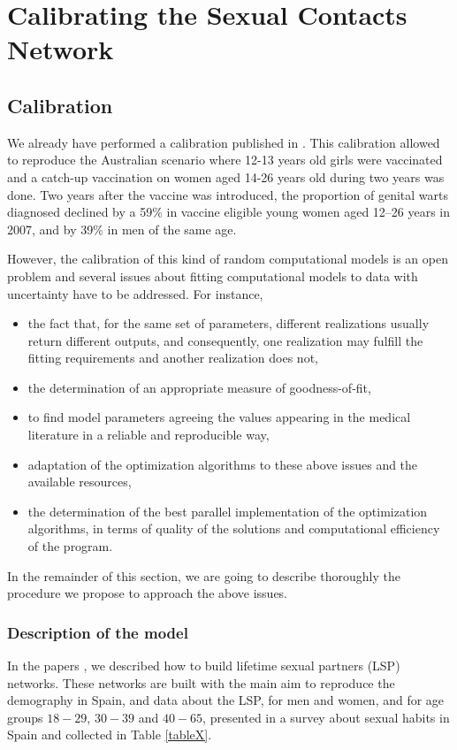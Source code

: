 \chapter{Calibrating the Sexual Contacts Network }\label{Calibrado}

\section{Calibration}
We already have performed a calibration published in \cite{Acedo2017}. This calibration allowed to reproduce the Australian scenario \cite{DezDomingo2017} where 12-13 years old girls were vaccinated and a catch-up vaccination on women aged 14-26 years old during two years was done. Two years after the vaccine was introduced, the proportion of genital warts diagnosed declined by a 59\% in vaccine eligible young women aged 12–26 years in 2007, and by 39\% in men of the same age.

However, the calibration of this kind of random computational models is an open problem and several issues about fitting computational models to data with uncertainty have to be addressed. For instance, 

\begin{itemize}
	\item the fact that, for the same set of parameters, different realizations usually return different outputs, and consequently, one realization may fulfill the fitting requirements and another realization does not,
	\item the determination of an appropriate measure of goodness-of-fit,
	\item to find model parameters agreeing the values appearing in the medical literature in a reliable and reproducible way,
	\item adaptation of the optimization algorithms to these above issues and the available resources,
	\item the determination of the best parallel implementation of the optimization algorithms, in terms of quality of the solutions and computational efficiency of the program.
\end{itemize} 

In the remainder of this section, we are going to describe thoroughly the procedure we propose to approach the above issues.

\subsection{Description of the model}\label{sec:modelo}
In the papers \cite{Acedo2017,DezDomingo2017}, we described how to build lifetime sexual partners (LSP) networks. These networks are built with the main aim to reproduce the demography in Spain, \cite{pegv} and data about the LSP, for men and women, and for age groups $18-29$, $30-39$ and $40-65$, presented in a survey about sexual habits in Spain \cite{INE} and collected in Table \ref{tableX}. 

